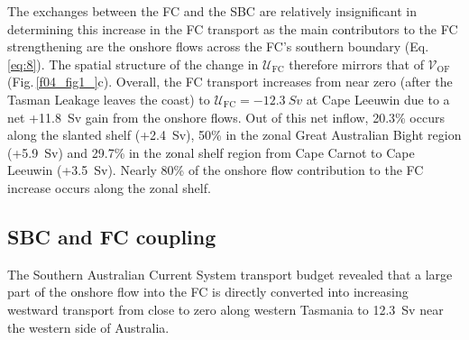 \documentclass[preprint,3p,review,12pt]{elsarticle}
\newcommand{\sub}[1]{_{\text{#1}}}
\begin{document}
The exchanges between the FC and the SBC are relatively insignificant in determining this increase in the FC transport as the main contributors to the FC strengthening are the
onshore flows
across the FC's southern boundary (Eq.\,\ref{eq:8}).
The spatial structure of the change
in $\mathcal{U}\sub{FC}$ therefore mirrors
that of $\mathcal{V}\sub{OF}$ (Fig.\,\ref{f04_fig1_}c).
Overall, the FC transport increases from near zero (after the Tasman Leakage leaves the coast) to $\mathcal{U}\sub{FC} = \SI{-12.3}{Sv}$
at Cape Leeuwin due to a net +\SI{11.8}{Sv} gain from the onshore flows. Out of this net inflow, 20.3\% occurs along the slanted shelf (+\SI{2.4}{Sv}), 50\% in the zonal Great Australian Bight region (+\SI{5.9}{Sv}) and 29.7\% in the zonal shelf region from Cape Carnot to Cape Leeuwin (+\SI{3.5}{Sv}). Nearly 80\% of the onshore flow contribution to the FC increase occurs along the zonal shelf.

\subsection{SBC and FC coupling}\label{SBC and FC coupling}
The Southern Australian Current System transport budget revealed that a large part of the onshore flow into the FC is directly converted into increasing westward transport from close to zero along western Tasmania to \SI{12.3}{Sv} near the western side of Australia.
\end{document}
